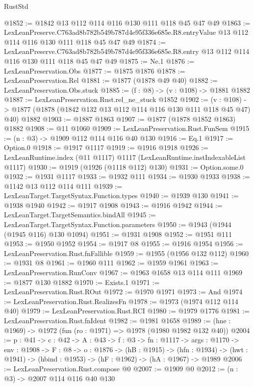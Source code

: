 \begin{lexlean}{RustStd}
\begin{coremodule}
@1852 := @1842 @13 @112 @114 @116 @130 @111 @118 @45 @47 @49
@1863 := LexLeanPreserve.C763ad8b782b549b787d4e95f336e685e.R8.entryValue
    @13
    @112
    @114
    @116
    @130
    @111
    @118
    @45
    @47
    @49
@1874 := LexLeanPreserve.C763ad8b782b549b787d4e95f336e685e.R8.entry
    @13
    @112
    @114
    @116
    @130
    @111
    @118
    @45
    @47
    @49
@1875 := Ne.{1}
@1876 := LexLeanPreservation.Obs
@1877 := @1875 @1876
@1878 := LexLeanPreservation.Rel
@1881 := @1877 (@1878 @49 @40)
@1882 := LexLeanPreservation.Obs.stuck
@1885 := (f : @8) -> (v : @108) -> @1881 @1882
@1887 := LexLeanPreservation.Rust.rel_ne_stuck @1852
@1902 := (v : @108) ->
  @1877 (@1878 (@1842 @132 @13 @112 @114 @116 @130 @111 @118 @45 @47) @40) @1882
@1903 := @1887 @1863
@1907 := @1877 (@1878 @1852 @1863) @1882
@1908 := @11 @1060
@1909 := LexLeanPreservation.Rust.FunSem
@1915 := (n : @3) -> @1909 @112 @114 @116 @40 @130
@1916 := Eq.{1}
@1917 := Option.{0}
@1918 := @1917 @1117
@1919 := @1916 @1918
@1926 := LexLeanRuntime.index (@11 @1117) @1117 (LexLeanRuntime.instIndexableList @1117)
@1930 := @1919 (@1926 (@1118 @112) @130)
@1931 := Option.some.{0}
@1932 := @1931 @1117
@1933 := @1932 @111
@1934 := @1930 @1933
@1938 := @1142 @13 @112 @114 @111
@1939 := LexLeanTarget.TargetSyntax.Function.types
@1940 := @1939 @130
@1941 := @1938 @1940
@1942 := @1917 @1908
@1943 := @1916 @1942
@1944 := LexLeanTarget.TargetSemantics.bindAll
@1945 := LexLeanTarget.TargetSyntax.Function.parameters
@1950 := @1943 (@1944 (@1945 @116) @130 @1094)
@1951 := @1931 @1908
@1952 := @1951 @111
@1953 := @1950 @1952
@1954 := @1917 @8
@1955 := @1916 @1954
@1956 := LexLeanPreservation.Rust.fnFallible
@1959 := @1955 (@1956 @132 @112)
@1960 := @1931 @8
@1961 := @1960 @111
@1962 := @1959 @1961
@1963 := LexLeanPreservation.RunConv
@1967 := @1963 @1658 @13 @114 @111
@1969 := @1877 @130 @1882
@1970 := Exists.{1}
@1971 := LexLeanPreservation.Rust.ROut
@1972 := @1970 @1971
@1973 := And
@1974 := LexLeanPreservation.Rust.RealizesFn
@1978 := @1973 (@1974 @112 @114 @40)
@1979 := LexLeanPreservation.Rust.RCI
@1980 := @1979 @1776
@1981 := LexLeanPreservation.Rust.fnIdent
@1982 := @1981 @1658
@1989 := (hne : @1969) -> @1972 (fun (ro : @1971) => @1978 (@1980 @1982 @132 @40))
@2004 := {p : @41} ->
  {c : @42} ->
  {A : @43} ->
  {f : @3} ->
  {fn : @1117} ->
  {args : @1170} ->
  {env : @1908} ->
  {F : @8} ->
  {o : @1876} ->
  (hB : @1915) ->
  (hfn : @1934) -> (hwt : @1941) -> (hbind : @1953) -> (hF : @1962) -> (hA : @1967) -> @1989
@2006 := LexLeanPreservation.Rust.compose @0
@2007 := @1909 @0
@2012 := (n : @3) -> @2007 @114 @116 @40 @130

\end{coremodule}
\end{lexlean}
